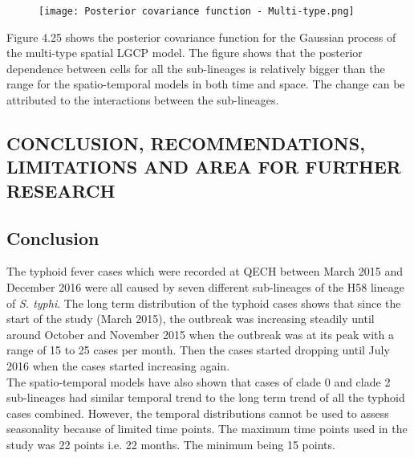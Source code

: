 \documentclass[12pt,a4paper]{report}
\begin{document}
\begin{figure}[H]
\begin{center}
\texttt{[image: Posterior covariance function - Multi-type.png]}
\end{center}
\end{figure}

Figure 4.25 shows the posterior covariance function for the Gaussian process of the multi-type spatial LGCP model. The figure shows that the posterior dependence between cells for all the sub-lineages is relatively bigger than the range for the spatio-temporal models in both time and space. The change can be attributed to the interactions between the sub-lineages.

\begin{center}
\chapter{CONCLUSION, RECOMMENDATIONS, LIMITATIONS AND AREA FOR FURTHER RESEARCH}
\end{center}

\section{Conclusion}

The typhoid fever cases which were recorded at QECH between March 2015 and December 2016 were all caused by seven different sub-lineages of the H58 lineage of \textit{S. typhi}. The long term distribution of the typhoid cases shows that since the start of the study (March 2015), the outbreak was increasing steadily until around October and November 2015 when the outbreak was at its peak with a range of 15 to 25 cases per month. Then the cases started dropping until July 2016 when the cases started increasing again.\\

The spatio-temporal models have also shown that cases of clade 0 and clade 2 sub-lineages had similar temporal trend to the long term trend of all the typhoid cases combined. However, the temporal distributions cannot be used to assess seasonality because of limited time points. The maximum time points used in the study was 22 points i.e. 22 months. The minimum being 15 points.\\
\end{document}
